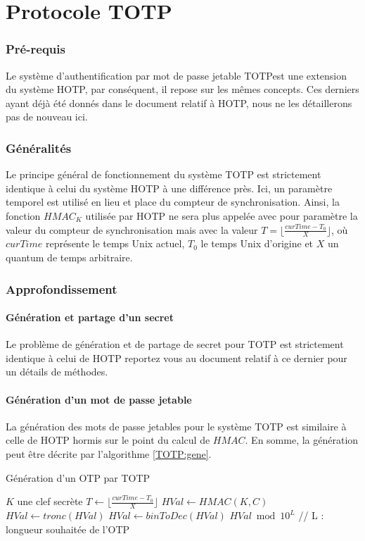 \documentclass{../res/univ-projet}
\begin{document}
\setcounter{section}{0}
\part{Protocole TOTP}

\section{Pré-requis}
Le système d'authentification par mot de passe jetable \og{}TOTP\fg est une extension du système \og{}HOTP\fg{}, par conséquent, il repose sur les mêmes concepts. Ces 
derniers ayant déjà été donnés dans le document relatif à \og{}HOTP\fg{}, nous ne les détaillerons pas de nouveau ici.

\section{Généralités}
Le principe général de fonctionnement du système \og{}TOTP\fg{} est strictement identique à celui du système \og{}HOTP\fg{} à une différence près. Ici, un paramètre 
temporel est utilisé en lieu et place du compteur de synchronisation. Ainsi, la fonction $HMAC_K$ utilisée par \og{}HOTP\fg{} ne sera plus appelée avec pour paramètre la 
valeur du compteur de synchronisation mais avec la valeur $T = \lfloor{}\frac{curTime - T_0}{X}\rfloor{}$, où $curTime$ représente le temps Unix actuel, $T_0$ le temps Unix \og{}
d'origine\fg{} et $X$ un quantum de temps arbitraire.

\section{Approfondissement}
  \subsection{Génération et partage d'un secret}
    Le problème de génération et de partage de secret pour \og{}TOTP\fg{} est strictement identique à celui de \og{}HOTP\fg{} reportez vous au document relatif à ce 
    dernier pour un détails de méthodes.
    
  \subsection{Génération d'un mot de passe jetable}
    La génération des mots de passe jetables pour le système \og{}TOTP\fg{} est similaire à celle de \og{}HOTP\fg{} hormis sur le point du calcul de $HMAC$. En somme, la 
    génération peut être décrite par l'algorithme \ref{TOTP:gene}.
    \begin{algorithm}
      \caption{Génération d'un OTP par TOTP}
      \label{TOTP:gene}
   
      \begin{algorithmic}
	\REQUIRE $K$ une clef secrète
	\STATE $T \leftarrow \lfloor{}\frac{curTime - T_0}{X}\rfloor{}$
	\STATE $HVal \leftarrow HMAC(K, C)$
	\STATE $HVal \leftarrow tronc(HVal)$
	\STATE $HVal \leftarrow binToDec(HVal)$
	\newline
	\RETURN $HVal \bmod 10^L$ // L : longueur souhaitée de l'OTP
      \end{algorithmic}
    \end{algorithm}
    
\end{document}

